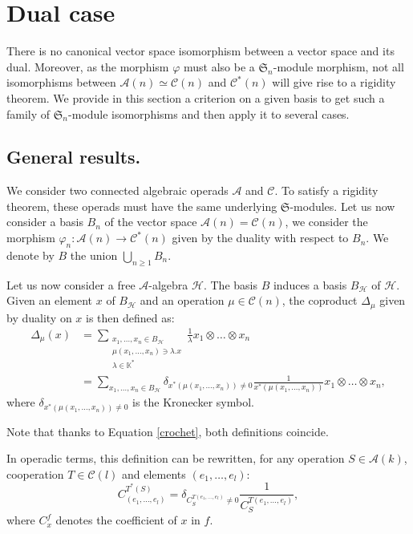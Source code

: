 \documentclass[11pt,leqno]{amsart}
\theoremstyle{definition}
\theoremstyle{plain}
\newcommand{\Hc}{ \mathcal{H} }
\newcommand{\A}{ \mathcal{A} }
\newcommand{\C}{ \mathcal{C} }
\begin{document}
\section{Dual case}

There is no canonical vector space isomorphism between a vector space and its dual. Moreover, as the morphism $\varphi$ must also be a $\mathfrak{S}_n$-module morphism, not all isomorphisms between $\A(n) \simeq \C(n)$ and $\C^*(n)$ will give rise to a rigidity theorem. We provide in this section a criterion on a given basis to get such a family of $\mathfrak{S}_n$-module isomorphisms and then apply it to several cases.

\subsection{General results.} 

We consider two connected algebraic operads $\A$ and $\C$. To satisfy a rigidity theorem, these operads must have the same underlying $\mathfrak{S}$-modules. Let us now consider a basis $B_n$ of the vector space $\A(n) = \C(n)$, we consider the morphism $\varphi_n: \A(n) \to \C^*(n)$ given by the duality with respect to $B_n$. We denote by $B$ the union $\bigcup_{n \geq 1} B_n$.


Let us now consider a free $\A$-algebra $\Hc$. The basis $B$ induces a basis $B_\Hc$ of $\Hc$. Given an element $x$ of $B_\Hc$ and an operation $\mu \in \C(n)$, the coproduct $\Delta_{\mu}$ given by duality on $x$ is then defined as:
\begin{align*}
\Delta_{\mu}(x)& = \sum_{\substack{x_1, \ldots, x_n \in B_{\Hc} \\ \mu(x_1, \ldots, x_n) \ni \lambda.x \\ \lambda \in \mathbb{K}^*}} \frac{1}{\lambda} x_1 \otimes \ldots \otimes x_n \\
& = \sum_{x_1, \ldots, x_n \in B_{\Hc}} \delta_{x^*(\mu(x_1, \ldots, x_n)) \neq 0} \frac{1}{x^*(\mu(x_1, \ldots, x_n))} x_1 \otimes \ldots \otimes x_n,
\end{align*} 
where $\delta_{x^*(\mu(x_1, \ldots, x_n)) \neq 0}$ is the Kronecker symbol.


Note that thanks to Equation \eqref{crochet}, both definitions coincide.

In operadic terms, this definition can be rewritten, for any operation $S \in \A(k)$, cooperation $T \in \C(l)$ and elements $(e_1, \ldots, e_l)$:
\begin{equation} \label{def2}
C^{T^* (S)}_{(e_1, \ldots, e_l)} = \delta_{C^{T(e_1, \ldots, e_l)}_S \neq 0} \frac{1}{C^{T(e_1, \ldots, e_l)}_S},
\end{equation}
where $C^f_x$ denotes the coefficient of $x$ in $f$.
\end{document}
